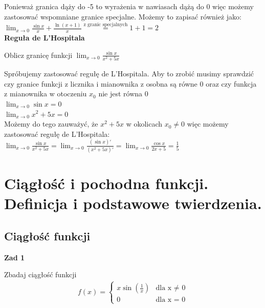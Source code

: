 \documentclass[12pt]{article}
\begin{document}
    \noindent Ponieważ granica dąży do -5 to wyrażenia w nawiasach dążą do 0 więc możemy zastosować wspomniane granice specjalne. Możemy to zapisać również jako: \\

    \noindent $\lim_{x \to 0} \frac{\sin{x}}{x} + \frac{\ln(x + 1)}{x} \stackrel{\text{z granic specjalnych}}{=} 1 + 1 = 2$ \\


    \noindent \textbf{Reguła de L'Hospitala} \\

    \begin{exercise}
		Oblicz granicę funkcji $\lim_{x \to 0} \frac{\sin{x}}{x^2 + 5x}$
	\end{exercise}

    \noindent Spróbujemy zastosować regułę de L'Hospitala. Aby to zrobić musimy sprawdzić czy granice funkcji z licznika i mianownika z osobna są równe 0 oraz czy funkcja z mianownika w otoczeniu $x_{0}$ nie jest równa 0 \\

    \noindent $\lim_{x \to 0} \sin{x} = 0$ \\
    \noindent $\lim_{x \to 0} x^2 + 5x = 0$ \\
    \noindent Możemy do tego zauważyć, że $x^2 + 5x$ w okolicach $x_{0} \neq 0$ więc możemy zastosować regułę de L'Hospitala: \\

    \noindent $\lim_{x \to 0} \frac{\sin{x}}{x^2 + 5x} = \lim_{x \to 0} \frac{(\sin{x})'}{(x^2 + 5x)'} = \lim_{x \to 0} \frac{\cos{x}}{2x + 5} = \frac{1}{5}$


    \newpage

    \section{Ciągłość i pochodna funkcji. Definicja i podstawowe twierdzenia.}

    \subsection{Ciągłość funkcji}

    \textbf{Zad 1} \\

    \begin{exercise}
		 Zbadaj ciągłość funkcji
		\begin{align*}
          	f(x) =
              \begin{cases}
              	x \sin(\frac{1}{x}) & \text{dla x $\neq$ 0} \\
                   0 & \text{dla x = 0}
              \end{cases}
    		\end{align*}
	\end{exercise}
\end{document}
